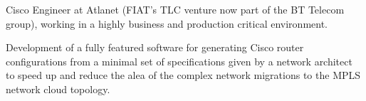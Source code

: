%



Cisco Engineer at Atlanet (FIAT's TLC venture now part of the BT Telecom group),
working in a highly business and production critical environment.

Development of a fully featured software for generating Cisco router
configurations from a minimal set of specifications given by a network architect
to speed up and reduce the alea of the complex network migrations to the
MPLS network cloud topology.

%

%


\vfill\eject


